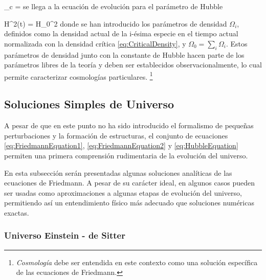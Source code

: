 { \rho_c =  }
se llega a la ecuación de evolución para el parámetro de Hubble


{ H^2(t) = H_0^2  }
donde se han introducido los parámetros de densidad $\Omega_i$, definidos 
como la densidad actual de la i-ésima especie en el tiempo actual 
normalizada con la densidad crítica \ref{eq:CriticalDensity}, y 
$\Omega_0 = \sum_i \Omega_i$. Estos parámetros de densidad junto con la 
constante de Hubble hacen parte de los parámetros libres de la teoría y 
deben ser establecidos observacionalmente, lo cual permite caracterizar 
cosmologías particulares. \footnote{\textit{Cosmología} debe ser 
entendida en este contexto como una solución específica de las ecuaciones 
de Friedmann.}


	\subsection{Soluciones Simples de Universo}
	\label{subsec:SimpleSolutionsOfTheUniverse}


A pesar de que en este punto no ha sido introducido el formalismo de 
pequeñas perturbaciones y la formación de estructuras, el conjunto de 
ecuaciones \ref{eq:FriedmannEquation1}, \ref{eq:FriedmannEquation2} y 
\ref{eq:HubbleEquation} permiten una primera comprensión rudimentaria de 
la evolución del universo.


En esta subsección serán presentadas algunas soluciones analíticas de las 
ecuaciones de Friedmann. A pesar de su carácter ideal, en algunos casos
pueden ser usadas como aproximaciones a algunas etapas de evolución del 
universo, permitiendo así un entendimiento físico más adecuado que 
soluciones numéricas exactas.


			\subsubsection*{Universo Einstein - de Sitter}


